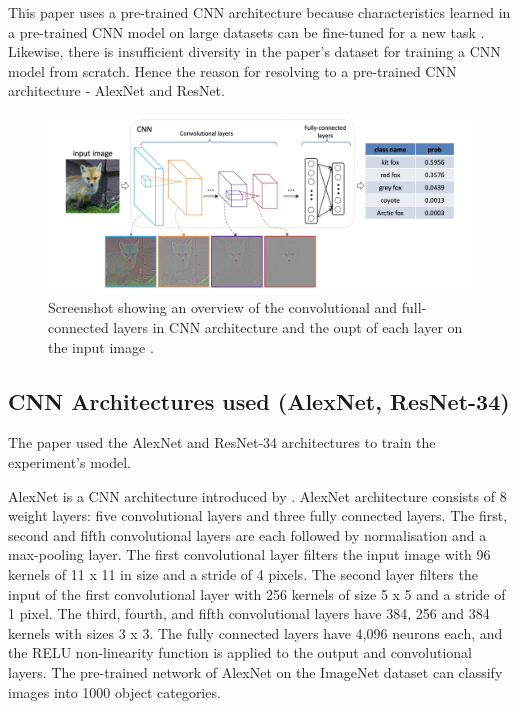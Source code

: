 \documentclass[conference]{IEEEtran}
\begin{document}
This paper uses a pre-trained CNN architecture because characteristics learned in a pre-trained CNN model on large datasets can be fine-tuned for a new task \cite{zhuang2020comprehensive}. Likewise, there is insufficient diversity in the paper's dataset for training a CNN model from scratch. Hence the reason for resolving to a pre-trained CNN architecture - AlexNet and ResNet. 


    \begin{figure}[htbp]
        \centerline{\includegraphics[scale=0.25]{figures/Screenshot 2021-11-24 at 14.35.12.png}}
        \caption{Screenshot showing an overview of the convolutional and full-connected layers in CNN architecture and the oupt of each layer on the input image \cite{soderkvist2001computer}.}

        \label{fig:train_gate}
    \end{figure}
    

\subsection{CNN Architectures used (AlexNet, ResNet-34)}
The paper used the AlexNet and ResNet-34 architectures to train the experiment's model.

AlexNet is a CNN architecture introduced by \cite{krizhevsky2012imagenet}. AlexNet architecture consists of 8 weight layers: five convolutional layers and three fully connected layers. The first, second and fifth convolutional layers are each followed by normalisation and a max-pooling layer. The first convolutional layer filters the input image with 96 kernels of 11 x 11 in size and a stride of 4 pixels. The second layer filters the input of the first convolutional layer with 256 kernels of size 5 x 5 and a stride of 1 pixel. The third, fourth, and fifth convolutional layers have 384, 256 and 384 kernels with sizes 3 x 3. The fully connected layers have 4,096 neurons each, and the RELU non-linearity function is applied to the output and convolutional layers.
The pre-trained network of AlexNet on the ImageNet dataset can classify images into 1000 object categories.
\end{document}
